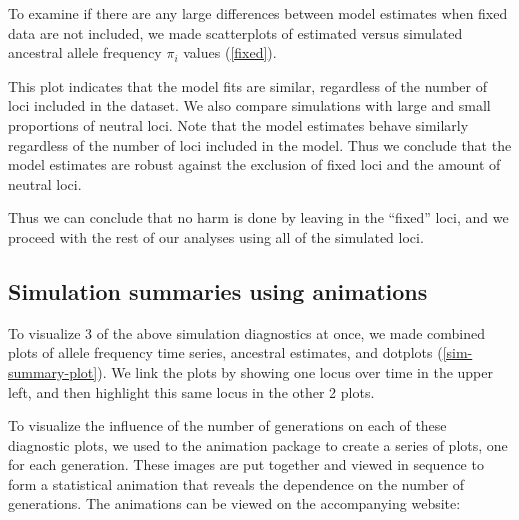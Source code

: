 \documentclass[a4paper,12pt]{article}
\begin{document}

To examine if there are any large differences between model estimates
when fixed data are not included, we made scatterplots of estimated
versus simulated ancestral allele frequency $\pi_i$ values
(\autoref{fixed}).


This plot indicates that the model fits are similar, regardless of the
number of loci included in the dataset. We also compare simulations
with large and small proportions of neutral loci. Note that the model
estimates behave similarly regardless of the number of loci included
in the model. Thus we conclude that the model estimates are robust
against the exclusion of fixed loci and the amount of neutral loci.

Thus we can conclude that no harm is done by leaving in the ``fixed''
loci, and we proceed with the rest of our analyses using all of the
simulated loci.

\subsection{Simulation summaries using animations}

To visualize 3 of the above simulation diagnostics at once, we made
combined plots of allele frequency time series, ancestral estimates,
and dotplots (\autoref{sim-summary-plot}). We link the plots by
showing one locus over time in the upper left, and then highlight this
same locus in the other 2 plots.


To visualize the influence of the number of generations on each of
these diagnostic plots, we used to the animation
package \cite{animation} to create a series of plots, one for each
generation. These images are put together and viewed in sequence to
form a statistical animation that reveals the dependence on the number
of generations. The animations can be viewed on the accompanying
website:
\end{document}
